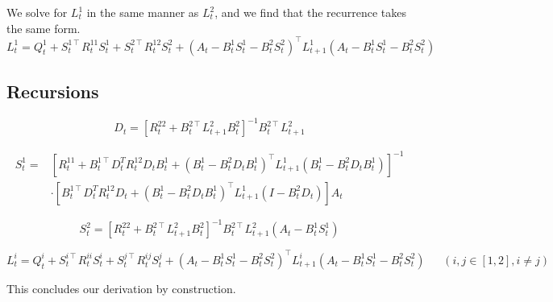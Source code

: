 \documentclass[11pt]{article}
\newcommand{\T}{\intercal}
\begin{document}
We solve for $L^1_t$ in the same manner as $L^2_t$, and we find that the recurrence takes the same form.
\begin{equation}
L^1_t = Q^1_t + S^{1\T}_t R^{11}_t S^1_t + S^{2\T}_t R^{12}_t S^2_t + \left(A_t - B^1_t S^1_t - B^2_t S^2_t\right)^\T L^1_{t+1} \left(A_t - B^1_t S^1_t - B^2_t S^2_t\right)
\end{equation}

\subsection{Recursions}

\begin{equation}
D_t = \left[ R^{22}_t + B^{2\T}_t L^2_{t+1} B^2_t \right]^{-1} B^{2\T}_t L^2_{t+1}
\end{equation}

\begin{equation}
\begin{split}
S^1_t = &\left[ R^{11}_t 
             + B^{1\T}_t D_t^T R^{12}_t D_t B^1_t
             + \left( B^1_t - B^2_t D_t B^1_t \right)^\T
               L^1_{t+1}
               \left( B^1_t - B^2_t D_t B^1_t \right)
      \right]^{-1} \\
      &\cdot \left[ B^{1\T}_t D_t^T R^{12}_t D_t
             + \left( B^1_t - B^2_t D_t B^1_t \right)^\T
               L^1_{t+1} \left(I - B^2_t D_t\right) \right]
      A_t
\end{split}
\end{equation}

\begin{equation}
S^2_t = \left[R^{22}_t + B^{2\T}_t L^2_{t+1} B^2_t\right]^{-1} B^{2\T}_t L^2_{t+1} \left( A_t - B^1_t S^1_t \right)
\end{equation}

\begin{equation}
L^i_t = Q^i_t + S^{i\T}_t R^{ii}_t S^i_t + S^{j\T}_t R^{ij}_t S^j_t + \left(A_t - B^1_t S^1_t - B^2_t S^2_t\right)^\T L^i_{t+1} \left(A_t - B^1_t S^1_t - B^2_t S^2_t\right) ~~~~~~~ (i, j \in [1, 2], i \neq j)
\end{equation}

This concludes our derivation by construction.




\end{document}
